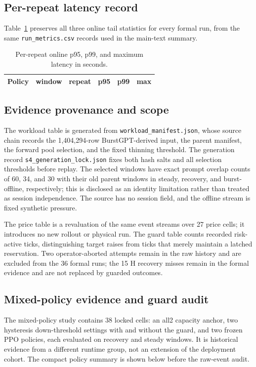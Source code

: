 \subsection{Per-repeat latency record}
Table~\ref{tab:tail} preserves all three online tail statistics for every formal
run, from the same \texttt{run\_metrics.csv} records used in the main-text summary.

\begin{table}[h]
\centering
\fontsize{8.5}{10}\selectfont
\caption{Per-repeat online p95, p99, and maximum latency in seconds.}
\label{tab:tail}
\setlength{\tabcolsep}{2pt}
\par\vspace{4pt}
\begin{tabular*}{\linewidth}{@{\extracolsep{\fill}}lllrrr@{}}
\toprule
Policy & window & repeat & p95 & p99 & max\\
\midrule

\end{tabular*}
\end{table}

\subsection{Evidence provenance and scope}
The workload table is generated from \texttt{workload\_manifest.json}, whose source chain
records the 1,404,294-row BurstGPT-derived input, the parent manifest, the forward
pool selection, and the fixed thinning threshold. The generation record
\texttt{s4\_generation\_lock.json} fixes both hash salts and all selection
thresholds before replay. The selected windows have exact
prompt overlap counts of 60, 34, and 30 with their old parent windows in
steady, recovery, and burst-offline, respectively; this is disclosed as an
identity limitation rather than treated as session independence. The source has
no session field, and the offline stream is fixed synthetic pressure.

The price table is a revaluation of the same event streams over 27 price cells;
it introduces no new rollout or physical run. The guard table counts recorded
risk-active ticks, distinguishing target raises from ticks that merely maintain a
latched reservation. Two operator-aborted attempts remain in the raw history and
are excluded from the 36 formal runs; the 15 H recovery misses remain in the
formal evidence and are not replaced by guarded outcomes.

\subsection{Mixed-policy evidence and guard audit}
The mixed-policy study contains 38 locked cells: an all2 capacity anchor,
two hysteresis down-threshold settings with and without the guard, and two frozen
PPO policies, each evaluated on recovery and steady windows. It is historical
evidence from a different runtime group, not an extension of the deployment cohort. The
compact policy summary is shown below before the raw-event audit.

